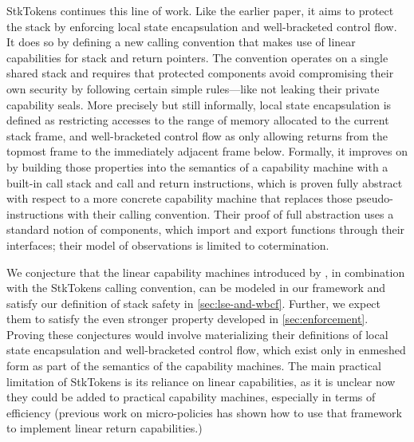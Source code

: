 \documentclass[acmsmall,review,anonymous]{acmart}\settopmatter{printfolios=true,printccs=false,printacmref=false}
\begin{document}
StkTokens \citep{Skorstengaard+19} continues this line of work. Like
the earlier paper, it aims to protect the stack by enforcing local state
encapsulation and well-bracketed control flow. It does so by defining a new
calling convention that makes use of linear capabilities for stack and return
pointers. The convention operates on a single shared stack and requires that
protected components avoid compromising their own security by following certain
simple rules---like not leaking their private capability seals. More
precisely but still informally, local state encapsulation is defined as
restricting accesses to the range of memory allocated to the current stack
frame, and well-bracketed control flow as only allowing returns from the topmost
frame to the immediately adjacent frame below. Formally, it improves on
\citet{Skorstengaard+19b} by building those properties into the semantics of a
capability machine with a built-in call stack and call and return instructions,
which is proven fully abstract with respect to a more concrete capability
machine that replaces those pseudo-instructions with their calling convention.
Their proof of full abstraction uses a standard notion of components, which
import and export functions through their interfaces; their model of
observations is limited to cotermination.

We conjecture that the linear capability machines introduced by
\citep{Skorstengaard+19}, in combination with the StkTokens calling convention,
can be modeled in our framework and satisfy our definition of stack safety in
\cref{sec:lse-and-wbcf}. Further, we expect them to satisfy the even stronger
property developed in \cref{sec:enforcement}. Proving these conjectures would
involve materializing their definitions of local state encapsulation and
well-bracketed control flow, which exist only in enmeshed form as part of the
semantics of the capability machines. The main practical limitation of StkTokens
is its reliance on linear capabilities, as it is unclear now they could be added
to practical capability machines, especially in terms of efficiency (previous
work on micro-policies \citep{yannis-report} has shown how to use that framework
to implement linear return capabilities.)
\end{document}
